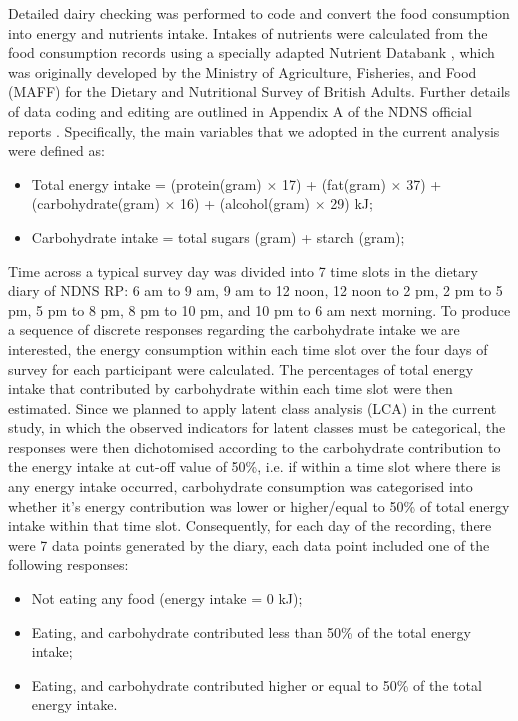 Detailed dairy checking was performed to code and convert the food consumption into energy and nutrients intake. Intakes of nutrients were calculated from the food consumption records using a specially adapted Nutrient Databank \parencite{smithers1993maff}, which was originally developed by the Ministry of Agriculture, Fisheries, and Food (MAFF) for the Dietary and Nutritional Survey of British Adults. Further details of data
coding and editing are outlined in Appendix A of the NDNS official reports \parencite{NDNSofficial}. Specifically, the main variables that we adopted in the current analysis were defined as: 

\begin{itemize}
	\item Total energy intake = (protein(gram) $\times$ 17) + (fat(gram) $\times$ 37) + (carbohydrate(gram) $\times$ 16) + (alcohol(gram) $\times$ 29)  kJ;
	\item Carbohydrate intake = total sugars (gram) + starch (gram); 
\end{itemize}

Time across a typical survey day was divided into 7 time slots in the dietary diary of NDNS RP: 6 am to 9 am, 9 am to 12 noon, 12 noon to 2 pm, 2 pm to 5 pm, 5 pm to 8 pm, 8 pm to 10 pm, and 10 pm to 6 am next morning. To produce a sequence of discrete responses regarding the carbohydrate intake we are interested, the energy consumption within each time slot over the four days of survey for each participant were calculated. The percentages of total energy intake that contributed by carbohydrate within each time slot were then estimated. Since we planned to apply latent class analysis (LCA) in the current study, in which the observed indicators for latent classes must be categorical, the responses were then dichotomised according to the carbohydrate contribution to the energy intake at cut-off value of 50\%, i.e. if within a time slot where there is any energy intake occurred, carbohydrate consumption was categorised into whether it's energy contribution was lower or higher/equal to 50\% of total energy intake within that time slot. Consequently, for each day of the recording, there were 7 data points generated by the diary, each data point included one of the following responses:

\begin{itemize}
	\item Not eating any food (energy intake = 0 kJ); 
	\item Eating, and carbohydrate contributed less than 50\% of the total energy intake;
	\item Eating, and carbohydrate contributed higher or equal to 50\% of the total energy intake.
\end{itemize}
\vspace{-0.5cm}


